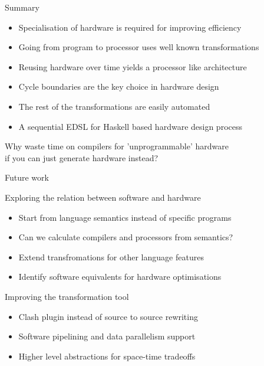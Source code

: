 \documentclass[pdf]{beamer}
\begin{document}
\begin{frame}{Summary}

\begin{itemize}
\item Specialisation of hardware is required for improving efficiency
\item Going from program to processor uses well known transformations
\item Reusing hardware over time yields a processor like architecture
\item Cycle boundaries are the key choice in hardware design
\item The rest of the transformations are easily automated
\item A sequential EDSL for Haskell based hardware design process
\end{itemize}

\alert{Why waste time on compilers for 'unprogrammable' hardware \\ if you can just generate hardware instead?}

\end{frame}


\begin{frame}{Future work}

\begin{block}{Exploring the relation between software and hardware}
\begin{itemize}
\item Start from language semantics instead of specific programs
\item Can we calculate compilers and processors from semantics?
\item Extend transfromations for other language features %
\item Identify software equivalents for hardware optimisations
\end{itemize}
\end{block}

\begin{block}{Improving the transformation tool}
\begin{itemize}
\item Clash plugin instead of source to source rewriting
\item Software pipelining and data parallelism support
\item Higher level abstractions for space-time tradeoffs
\end{itemize}
\end{block}

\end{frame}
\end{document}
